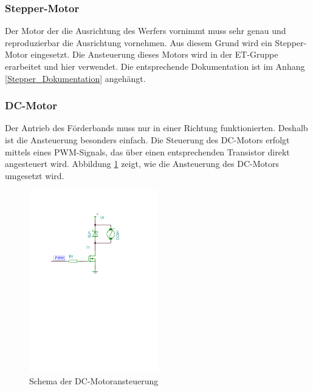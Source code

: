 \subsubsection{Stepper-Motor}
    Der Motor der die Ausrichtung des Werfers vornimmt muss sehr genau und reproduzierbar die Ausrichtung vornehmen. Aus diesem Grund wird ein Stepper-Motor eingesetzt. Die Ansteuerung dieses Motors wird in der ET-Gruppe erarbeitet und hier verwendet. Die entsprechende Dokumentation ist im Anhang \ref{Stepper_Dokumentation} angehängt.
\subsubsection{DC-Motor}
    Der Antrieb des Förderbands muss nur in einer Richtung funktionierten. Deshalb ist die Ansteuerung besonders einfach. Die Steuerung des DC-Motors erfolgt mittels eines PWM-Signals, das über einen entsprechenden Transistor direkt angesteuert wird. Abbildung \ref{fig:Schema_DC-Motor} zeigt, wie die Ansteuerung des DC-Motors umgesetzt wird.
    \begin{figure}[h!] %
    	\centering
    	\includegraphics[width=0.5\textwidth,clip,trim=37mm 159mm 62mm 37mm]
    	{Enddokumentation/Loesungskonzept/Bilder/SchemaDcMotor.pdf}
    	\caption{Schema der DC-Motoransteuerung}
    	\label{fig:Schema_DC-Motor}
    \end{figure}